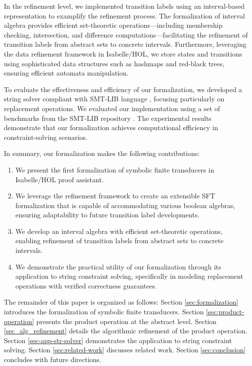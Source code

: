 In the refinement level, we implemented transition labels using an interval-based representation to examplify the refinement process. The formalization of interval algebra provides efficient set-theoretic operations—including membership checking, intersection, and difference computations—facilitating the refinement of transition labels from abstract sets to concrete intervals. Furthermore, leveraging the data refinement framework \cite{DBLP:conf/itp/Lammich13} in Isabelle/HOL, we store states and transitions using sophisticated data structures such as hashmaps and red-black trees, ensuring efficient automata manipulation.

To evaluate the effectiveness and efficiency of our formalization, we developed a string solver compliant with SMT-LIB language \cite{smtlib}, focusing particularly on replacement operations. We evaluated our implementation using a set of benchmarks from the SMT-LIB repository \cite{smtlib_benchmarks}. The experimental results demonstrate that our formalization achieves computational efficiency in constraint-solving scenarios.



In summary, our formalization makes the following contributions:
\begin{enumerate}
\item We present the first formalization of symbolic finite transducers in Isabelle/HOL proof assistant.
\item We leverage the refinement framework to create an extensible SFT formalization that is capable of accommodating various boolean algebras, ensuring adaptability to future transition label developments.
\item We develop an interval algebra with efficient set-theoretic operations, enabling refinement of transition labels from abstract sets to concrete intervals.
\item We demonstrate the practical utility of our formalization through its application to string constraint solving, specifically in modeling replacement operations with verified correctness guarantees.
\end{enumerate}

The remainder of this paper is organized as follows:
Section \ref{sec:formalization} introduces the formalization of symbolic finite transducers.
Section \ref{sec:product-operation} presents the product operation at the abstract level.
Section \ref{sec_alg_refinement} details the algorithmic refinement of the product operation.
Section \ref{sec-app-str-solver} demonstrates the application to string constraint solving.
Section \ref{sec:related-work} discusses related work.
Section \ref{sec:conclusion} concludes with future directions.
